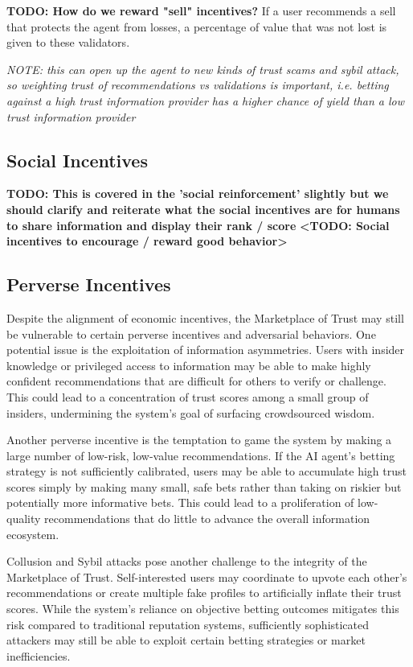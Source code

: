 \documentclass{article}
\begin{document}
\textbf{TODO: How do we reward "sell" incentives?}
If a user recommends a sell that protects the agent from losses, a percentage of value that was not lost is given to these validators.

\textit{NOTE: this can open up the agent to new kinds of trust scams and sybil attack, so weighting trust of recommendations vs validations is important, i.e. betting against a high trust information provider has a higher chance of yield than a low trust information provider
}

\subsection{Social Incentives}
\textbf{TODO: This is covered in the 'social reinforcement' slightly but we should clarify and reiterate what the social incentives are for humans to share information and display their rank / score
}\textbf{<TODO: Social incentives to encourage / reward good behavior>}

\subsection{Perverse Incentives}
Despite the alignment of economic incentives, the Marketplace of Trust may still be vulnerable to certain perverse incentives and adversarial behaviors. One potential issue is the exploitation of information asymmetries. Users with insider knowledge or privileged access to information may be able to make highly confident recommendations that are difficult for others to verify or challenge. This could lead to a concentration of trust scores among a small group of insiders, undermining the system's goal of surfacing crowdsourced wisdom.

Another perverse incentive is the temptation to game the system by making a large number of low-risk, low-value recommendations. If the AI agent's betting strategy is not sufficiently calibrated, users may be able to accumulate high trust scores simply by making many small, safe bets rather than taking on riskier but potentially more informative bets. This could lead to a proliferation of low-quality recommendations that do little to advance the overall information ecosystem.  

Collusion and Sybil attacks pose another challenge to the integrity of the Marketplace of Trust. Self-interested users may coordinate to upvote each other's recommendations or create multiple fake profiles to artificially inflate their trust scores. While the system's reliance on objective betting outcomes mitigates this risk compared to traditional reputation systems, sufficiently sophisticated attackers may still be able to exploit certain betting strategies or market inefficiencies.
\end{document}
